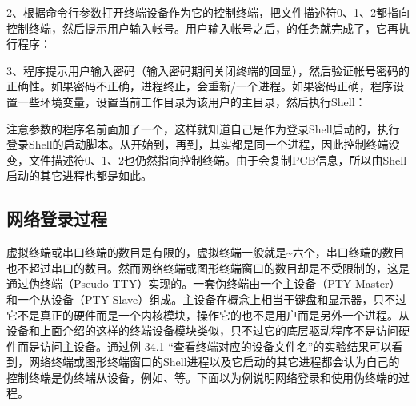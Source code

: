 2、根据命令行参数打开终端设备作为它的控制终端，把文件描述符0、1、2都指向控制终端，然后提示用户输入帐号。用户输入帐号之后，的任务就完成了，它再执行程序：




3、程序提示用户输入密码（输入密码期间关闭终端的回显），然后验证帐号密码的正确性。如果密码不正确，进程终止，会重新/一个进程。如果密码正确，程序设置一些环境变量，设置当前工作目录为该用户的主目录，然后执行Shell：




注意参数的程序名前面加了一个\BookCode{-\BookSplit{}}，这样就知道自己是作为登录Shell启动的，执行登录Shell的启动脚本。从开始到，再到，其实都是同一个进程，因此控制终端没变，文件描述符0、1、2也仍然指向控制终端。由于会复制PCB信息，所以由Shell启动的其它进程也都是如此。


\subsection{网络登录过程}
%


虚拟终端或串口终端的数目是有限的，虚拟终端一般就是\textasciitilde{}六个，串口终端的数目也不超过串口的数目。然而网络终端或图形终端窗口的数目却是不受限制的，这是通过伪终端（Pseudo TTY）实现的。一套伪终端由一个主设备（PTY Master）和一个从设备（PTY Slave）组成。主设备在概念上相当于键盘和显示器，只不过它不是真正的硬件而是一个内核模块，操作它的也不是用户而是另外一个进程。从设备和上面介绍的这样的终端设备模块类似，只不过它的底层驱动程序不是访问硬件而是访问主设备。通过\hyperlink{db.ch34s01.id2891071}{例 34.\BookSplit{}1 “查看终端对应的设备文件名”}的实验结果可以看到，网络终端或图形终端窗口的Shell进程以及它启动的其它进程都会认为自己的控制终端是伪终端从设备，例如、等。下面以为例说明网络登录和使用伪终端的过程。



